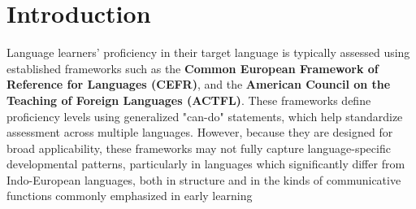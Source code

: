 \chapter{Introduction}










Language learners' proficiency in their target language is typically assessed using established frameworks such as
the \textbf{Common European Framework of Reference for Languages (CEFR)}, and the
\textbf{American Council on the Teaching of Foreign Languages (ACTFL)}. These frameworks define proficiency levels
using generalized "can-do" statements, which help standardize assessment across multiple languages. However,
because they are designed for broad
applicability, these frameworks may
not fully capture language-specific developmental patterns, particularly in languages which significantly differ
from Indo-European languages, both in structure and in the kinds of
communicative functions commonly emphasized in early learning

